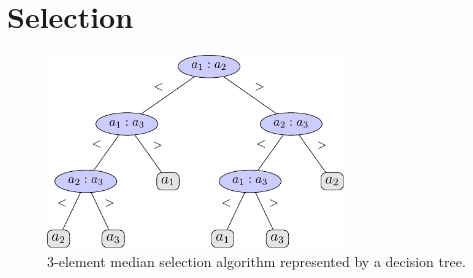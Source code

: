 
\chapter{Selection}	\label{chapter:selection}

\begin{figure}
  \centering
  \includegraphics[width = 0.70\textwidth]{figs/3-median}
  \caption{$3$-element median selection algorithm represented by a decision tree.}
  \label{fig:3-median}
\end{figure}
